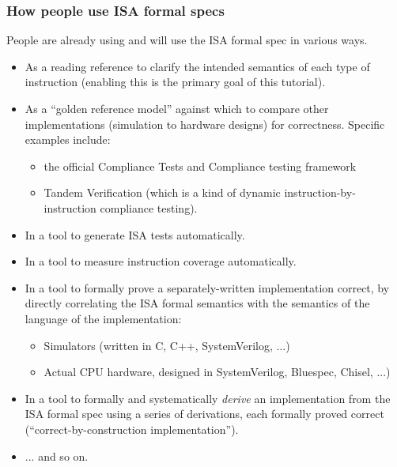 \documentclass[aspectratio=169]{beamer}
\newcommand{\slidefont}{\scriptsize}
\begin{document}

\begin{frame}[fragile]
  \frametitle{How people use ISA formal specs}

  \slidefont

  People are already using and will use the ISA formal spec in various ways.

  \begin{itemize}

    \item As a reading reference to clarify the intended semantics of
      each type of instruction (enabling this is the primary goal of
      this tutorial).

    \item As a ``golden reference model'' against which to compare
      other implementations (simulation to hardware designs) for
      correctness.  Specific examples include:

      \begin{itemize}\slidefont
      \item the official Compliance Tests and Compliance testing framework
      \item Tandem Verification (which is a kind of dynamic instruction-by-instruction compliance testing).
      \end{itemize}

    \item In a tool to generate ISA tests automatically.

    \item In a tool to measure instruction coverage automatically.

    \item In a tool to formally prove a separately-written
      implementation correct, by directly correlating the ISA formal
      semantics with the semantics of the language of the
      implementation:
      
      \begin{itemize}\slidefont
      \item Simulators (written in C, C++, SystemVerilog, ...)
      \item Actual CPU hardware, designed in SystemVerilog, Bluespec, Chisel, ...)
      \end{itemize}


    \item In a tool to formally and systematically \emph{derive} an
      implementation from the ISA formal spec using a series of
      derivations, each formally proved correct
      (``correct-by-construction implementation'').

    \item ... and so on.
  \end{itemize}

\end{frame}
\end{document}
